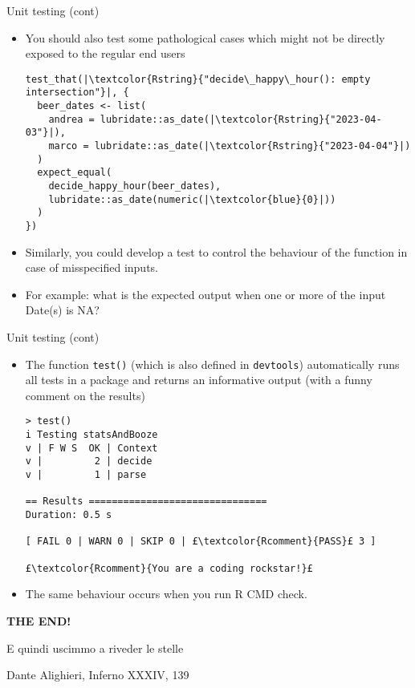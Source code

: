 \documentclass[
hyperref={bookmarks=false},
xcolor={dvipsnames,svgnames*,x11names*}, 
12pt
]{beamer}
\begin{document}
\begin{frame}[fragile]{Unit testing (cont)}
\vspace{-0.5cm}
\begin{itemize}
\itemsep 1ex
\item You should also test some pathological cases which might not be directly exposed to the regular end users
\begin{lstlisting}
test_that(|\textcolor{Rstring}{"decide\_happy\_hour(): empty intersection"}|, {
  beer_dates <- list(
    andrea = lubridate::as_date(|\textcolor{Rstring}{"2023-04-03"}|),
	marco = lubridate::as_date(|\textcolor{Rstring}{"2023-04-04"}|)
  )
  expect_equal(
    decide_happy_hour(beer_dates),
	lubridate::as_date(numeric(|\textcolor{blue}{0}|))
  )
})
\end{lstlisting}
\item Similarly, you could develop a test to control the behaviour of the function in case of misspecified inputs. 
\item For example: what is the expected output when one or more of the input Date(s) is NA?
\end{itemize}
\end{frame}


\begin{frame}[fragile]{Unit testing (cont)}
\vspace{-0.5cm}
\begin{itemize}
\itemsep 2ex
\item The function \texttt{test()} (which is also defined in \texttt{devtools}) automatically runs all tests in a package and returns an informative output (with a funny comment on the results)
\begin{lstlisting}
> test()
i Testing statsAndBooze
v | F W S  OK | Context
v |         2 | decide
v |         1 | parse
	
== Results ===============================
Duration: 0.5 s
		
[ FAIL 0 | WARN 0 | SKIP 0 | £\textcolor{Rcomment}{PASS}£ 3 ] 
		
£\textcolor{Rcomment}{You are a coding rockstar!}£
\end{lstlisting}
\item The same behaviour occurs when you run R CMD check.
\end{itemize}
\end{frame}

\begin{frame}
\vspace{2cm}
\begin{center}
\Huge
\textbf{THE END!}
\end{center}
\vspace{1.5cm}
\epigraph{E quindi uscimmo a riveder le stelle}{Dante Alighieri, Inferno XXXIV, 139}
\end{frame}
\end{document}
